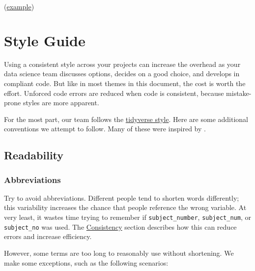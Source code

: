 \documentclass[
]{book}
\begin{document}
(\href{https://github.com/OuhscBbmc/RedcapExamplesAndPatterns/blob/master/DocumentationGlobal/ResourcesInstallation.md}{example})

\hypertarget{style-guide}{%
\chapter{Style Guide}\label{style-guide}}

Using a consistent style across your projects can increase the overhead as your data science team discusses options, decides on a good choice, and develops in compliant code. But like in most themes in this document, the cost is worth the effort. Unforced code errors are reduced when code is consistent, because mistake-prone styles are more apparent.

For the most part, our team follows the \href{https://style.tidyverse.org/}{tidyverse style}. Here are some additional conventions we attempt to follow. Many of these were inspired by \citep{balena-dimauro}.

\hypertarget{readability}{%
\section{Readability}\label{readability}}

\hypertarget{style-abbreviation}{%
\subsection{Abbreviations}\label{style-abbreviation}}

Try to avoid abbreviations. Different people tend to shorten words differently; this variability increases the chance that people reference the wrong variable. At very least, it wastes time trying to remember if \texttt{subject\_number}, \texttt{subject\_num}, or \texttt{subject\_no} was used. The \protect\hyperlink{architecture-consistency}{Consistency} section describes how this can reduce errors and increase efficiency.

However, some terms are too long to reasonably use without shortening. We make some exceptions, such as the following scenarios:
\end{document}
